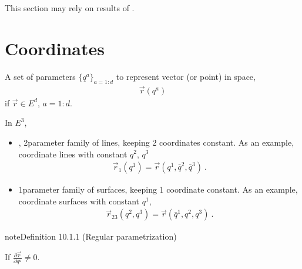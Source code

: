 \documentclass[letterpaper,10pt,english]{jupyterBook}
\begin{document}
\sphinxAtStartPar
This section may rely on results of {\hyperref[\detokenize{ch/differential-geometry/intro:differential-geometry-intro}]{}}.


\section{Coordinates}
\label{\detokenize{ch/tensor-algebra-calculus/calculus-euclidean:coordinates}}\label{\detokenize{ch/tensor-algebra-calculus/calculus-euclidean:tensor-calculus-coordinates}}
\sphinxAtStartPar
A set of parameters \(\{q^a\}_{a=1:d}\) to represent vector (or point) in space,
\begin{equation*}
\begin{split}\vec{r}(q^a)\end{split}
\end{equation*}
\sphinxAtStartPar
if \(\vec{r} \in E^{d}\), \(a=1:d\).

\sphinxAtStartPar
In \(E^3\),
\begin{itemize}
\item {} 
\sphinxAtStartPar
{}, 2\sphinxhyphen{}parameter family of lines, keeping 2 coordinates constant. As an example, coordinate lines with constant \(q^2, \, q^3\)
\begin{equation*}
\begin{split}\vec{r}_1(q^1) = \vec{r}(q^1, \bar{q}^2, \bar{q}^3) \ .\end{split}
\end{equation*}
\item {} 
\sphinxAtStartPar
{} 1\sphinxhyphen{}parameter family of surfaces, keeping 1 coordinate constant. As an example, coordinate surfaces with constant \(q^1\),
\begin{equation*}
\begin{split}\vec{r}_{23}(q^2, q^3) = \vec{r}(\bar{q}^1, q^2, q^3) \ .\end{split}
\end{equation*}
\end{itemize}
\label{ch/tensor-algebra-calculus/calculus-euclidean:definition-0}
\begin{sphinxadmonition}{note}{Definition 10.1.1 (Regular parametrization)}



\sphinxAtStartPar
If \(\frac{\partial \vec{r}}{\partial q^a} \ne 0\).
\end{sphinxadmonition}
\end{document}
